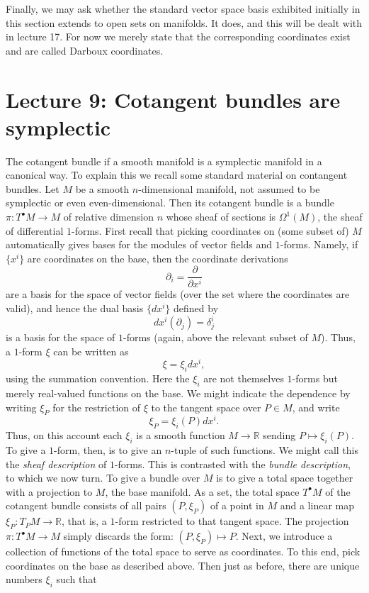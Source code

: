 \documentclass[11pt]{article} %
\begin{document}
Finally, we may ask whether the standard vector space basis exhibited initially in this section extends to open sets on manifolds. It does, and this will be dealt with in lecture 17. For now we merely state that the corresponding coordinates exist and are called Darboux coordinates.


\section*{Lecture 9: Cotangent bundles are symplectic}
The cotangent bundle if a smooth manifold is a symplectic manifold in a canonical way. To explain this we recall some standard material on contangent bundles. Let $M$ be a smooth $n$-dimensional manifold, not assumed to be symplectic or even even-dimensional. Then its cotangent bundle is a bundle $\pi:T^\bullet M \rightarrow M$ of relative dimension $n$ whose sheaf of sections is $\Omega^1(M)$, the sheaf of differential $1$-forms. First recall that picking coordinates on (some subset of) $M$ automatically gives bases for the modules of vector fields and $1$-forms. Namely, if $\{x^i\}$ are coordinates on the base, then the coordinate derivations
$$
\partial_i = \frac{\partial}{\partial x^i}
$$
are a basis for the space of vector fields (over the set where the coordinates are valid), and hence the dual basis $\{dx^i\}$ defined by
$$
dx^i(\partial_j) = \delta^i_j
$$
is a basis for the space of $1$-forms (again, above the relevant subset of $M$). Thus, a $1$-form $\xi$ can be written as 
$$
\xi = \xi_i dx^i,
$$
using the summation convention. Here the $\xi_i$ are not themselves $1$-forms but merely real-valued functions on the base. We might indicate the dependence by writing $\xi_P$ for the restriction of $\xi$ to the tangent space over $P\in M$, and write
$$
\xi_P = \xi_i(P) dx^i.
$$
Thus, on this account each $\xi_i$ is a smooth function $M \rightarrow \mathbb{R}$ sending $P \mapsto \xi_i (P)$. To give a $1$-form, then, is to give an $n$-tuple of such functions. We might call this the \emph{sheaf description} of $1$-forms. This is contrasted with the \emph{bundle description}, to which we now turn. To give a bundle over $M$ is to give a total space together with a projection to $M$, the base manifold. As a set, the total space $T^\bullet M$ of the cotangent bundle consists of all pairs $(P, \xi_P)$ of a point in $M$ and a linear map $\xi_P: T_PM \rightarrow \mathbb{R}$, that is, a $1$-form restricted to that tangent space. The projection $\pi: T^\bullet M \rightarrow M$ simply discards the form: $(P, \xi_P)\mapsto P$. Next, we introduce a collection of functions of the total space to serve as coordinates. To this end, pick coordinates on the base as described above. Then just as before, there are unique numbers $\xi_i$ such that
\end{document}
